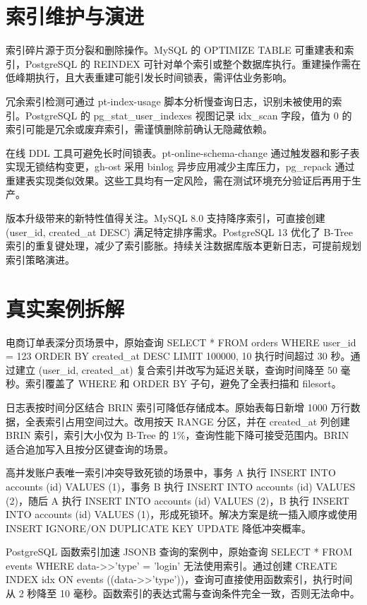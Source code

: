 \chapter{索引维护与演进}
索引碎片源于页分裂和删除操作。MySQL 的 OPTIMIZE TABLE 可重建表和索引，PostgreSQL 的 REINDEX 可针对单个索引或整个数据库执行。重建操作需在低峰期执行，且大表重建可能引发长时间锁表，需评估业务影响。\par
冗余索引检测可通过 pt-index-usage 脚本分析慢查询日志，识别未被使用的索引。PostgreSQL 的 pg\_{}stat\_{}user\_{}indexes 视图记录 idx\_{}scan 字段，值为 0 的索引可能是冗余或废弃索引，需谨慎删除前确认无隐藏依赖。\par
在线 DDL 工具可避免长时间锁表。pt-online-schema-change 通过触发器和影子表实现无锁结构变更，gh-ost 采用 binlog 异步应用减少主库压力，pg\_{}repack 通过重建表实现类似效果。这些工具均有一定风险，需在测试环境充分验证后再用于生产。\par
版本升级带来的新特性值得关注。MySQL 8.0 支持降序索引，可直接创建 (user\_{}id, created\_{}at DESC) 满足特定排序需求。PostgreSQL 13 优化了 B-Tree 索引的重复键处理，减少了索引膨胀。持续关注数据库版本更新日志，可提前规划索引策略演进。\par
\chapter{真实案例拆解}
电商订单表深分页场景中，原始查询 SELECT * FROM orders WHERE user\_{}id = 123 ORDER BY created\_{}at DESC LIMIT 100000, 10 执行时间超过 30 秒。通过建立 (user\_{}id, created\_{}at) 复合索引并改写为延迟关联，查询时间降至 50 毫秒。索引覆盖了 WHERE 和 ORDER BY 子句，避免了全表扫描和 filesort。\par
日志表按时间分区结合 BRIN 索引可降低存储成本。原始表每日新增 1000 万行数据，全表索引占用空间过大。改用按天 RANGE 分区，并在 created\_{}at 列创建 BRIN 索引，索引大小仅为 B-Tree 的 1\%{}，查询性能下降可接受范围内。BRIN 适合追加写入且按分区键查询的场景。\par
高并发账户表唯一索引冲突导致死锁的场景中，事务 A 执行 INSERT INTO accounts (id) VALUES (1)，事务 B 执行 INSERT INTO accounts (id) VALUES (2)，随后 A 执行 INSERT INTO accounts (id) VALUES (2)，B 执行 INSERT INTO accounts (id) VALUES (1)，形成死锁环。解决方案是统一插入顺序或使用 INSERT IGNORE/ON DUPLICATE KEY UPDATE 降低冲突概率。\par
PostgreSQL 函数索引加速 JSONB 查询的案例中，原始查询 SELECT * FROM events WHERE data->>'type' = 'login' 无法使用索引。通过创建 CREATE INDEX idx ON events ((data->>'type'))，查询可直接使用函数索引，执行时间从 2 秒降至 10 毫秒。函数索引的表达式需与查询条件完全一致，否则无法命中。\par
